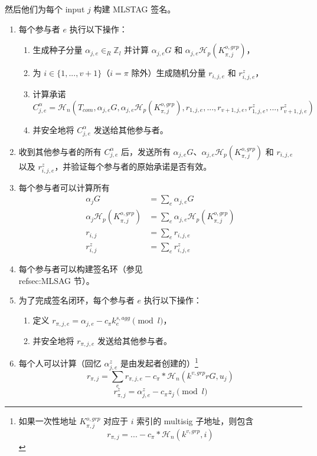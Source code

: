 然后他们为每个 input $j$ 构建 MLSTAG 签名。
\begin{enumerate}
    \item 每个参与者 $e$ 执行以下操作：
    \begin{enumerate}
        \item 生成种子分量 $\alpha_{j,e} \in_R \mathbb{Z}_l$ 并计算 $\alpha_{j,e} G$ 和 $\alpha_{j,e} \mathcal{H}_p(K^{o,grp}_{\pi,j})$，
        \item 为 $i \in \{1,...,v+1\}$（$i = \pi$ 除外）生成随机分量 $r_{i,j,e}$ 和 $r^z_{i,j,e}$，
        \item 计算承诺
        \[C^{\alpha}_{j,e} = \mathcal{H}_n(T_{com},\alpha_{j,e} G, \alpha_{j,e} \mathcal{H}_p(K^{o,grp}_{\pi,j}),r_{1,j,e},...,r_{v+1,j,e},r^z_{1,j,e},...,r^z_{v+1,j,e})\]
        \item 并安全地将 $C^{\alpha}_{j,e}$ 发送给其他参与者。
    \end{enumerate}
    \item 收到其他参与者的所有 $C^{\alpha}_{j,e}$ 后，发送所有 $\alpha_{j,e} G$、$\alpha_{j,e} \mathcal{H}_p(K^{o,grp}_{\pi,j})$ 和 $r_{i,j,e}$ 以及 $r^z_{i,j,e}$，并验证每个参与者的原始承诺是否有效。
    \item 每个参与者可以计算所有
    \begin{align*}
        \alpha_{j} G &= \sum_e \alpha_{j,e} G\\
        \alpha_{j} \mathcal{H}_p(K^{o,grp}_{\pi,j}) &= \sum_e \alpha_{j,e} \mathcal{H}_p(K^{o,grp}_{\pi,j})\\
        r_{i,j} &= \sum_e r_{i,j,e}\\
        r^{z}_{i,j} &= \sum_e r^z_{i,j,e}
    \end{align*}{}
    \item 每个参与者可以构建签名环（参见 \\ref{sec:MLSAG} 节）。
    \item 为了完成签名闭环，每个参与者 $e$ 执行以下操作：
    \begin{enumerate}
        \item 定义 $r_{\pi,j,e} = \alpha_{j,e} - c_{\pi} k^{s,agg}_e \pmod l$，
        \item 并安全地将 $r_{\pi,j,e}$ 发送给其他参与者。
    \end{enumerate}
    \item 每个人可以计算（回忆 $\alpha^z_{j,e}$ 是由发起者创建的）\footnote{如果一次性地址 $K^{o,grp}_{\pi,j}$ 对应于 $i$ 索引的 multisig 子地址，则包含
    \[r_{\pi,j} = ... - c_{\pi}*\mathcal{H}_n(k^{v,grp},i)\]}\vspace{.175cm}
    \[r_{\pi,j} = \sum_e r_{\pi,j,e} - c_{\pi}*\mathcal{H}_n(k^{v,grp} r G, u_j)\]
    \[r^{z}_{\pi,j} = \alpha^z_{j,e} - c_{\pi} z_j \pmod l\]
\end{enumerate}

